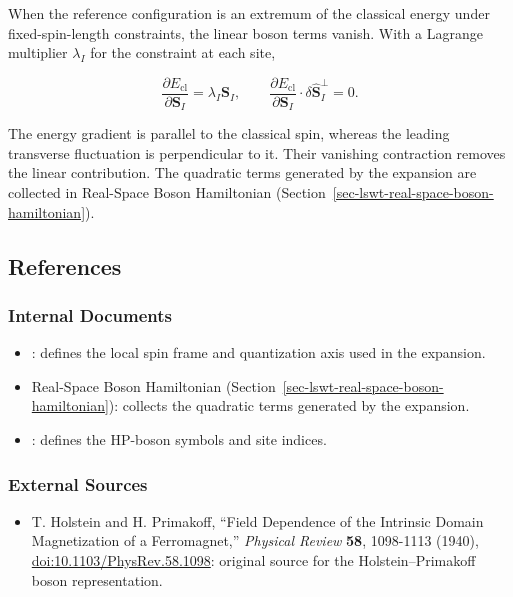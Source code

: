 When the reference configuration is an extremum of the classical energy under fixed-spin-length constraints, the linear boson terms vanish. With a Lagrange multiplier \(\lambda_I\) for the constraint at each site,

\[
\frac{\partial E_{\mathrm{cl}}}{\partial\mathbf S_I}
=\lambda_I\mathbf S_I,
\qquad
\frac{\partial E_{\mathrm{cl}}}{\partial\mathbf S_I}
\cdot\delta\hat{\mathbf S}_I^\perp=0.
\]

The energy gradient is parallel to the classical spin, whereas the leading transverse fluctuation is perpendicular to it. Their vanishing contraction removes the linear contribution. The quadratic terms generated by the expansion are collected in Real-Space Boson Hamiltonian (Section~\ref{sec-lswt-real-space-boson-hamiltonian}).

\subsection{References}

\subsubsection{Internal Documents}

\begin{itemize}
\tightlist
\item
  : defines the local spin frame and quantization axis used in the expansion.
\item
  Real-Space Boson Hamiltonian (Section~\ref{sec-lswt-real-space-boson-hamiltonian}): collects the quadratic terms generated by the expansion.
\item
  : defines the HP-boson symbols and site indices.
\end{itemize}

\subsubsection{External Sources}

\begin{itemize}
\tightlist
\item
  T. Holstein and H. Primakoff, ``Field Dependence of the Intrinsic Domain Magnetization of a Ferromagnet,'' \emph{Physical Review} \textbf{58}, 1098-1113 (1940), \href{https://doi.org/10.1103/PhysRev.58.1098}{doi:10.1103/PhysRev.58.1098}: original source for the Holstein--Primakoff boson representation.
\end{itemize}
